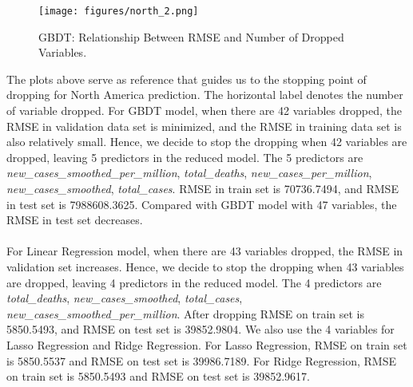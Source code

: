 \documentclass{article}
\begin{document}
\begin{figure}[H]
    \centering
    \texttt{[image: figures/north\_2.png]}%
    \caption{GBDT: Relationship Between RMSE and Number of Dropped Variables.}
    \label{fig:heatmap}
\end{figure}

The plots above serve as reference that guides us to the stopping point of dropping for North America prediction. The horizontal label denotes the number of variable dropped. For GBDT model, when there are 42 variables dropped, the RMSE in validation data set is minimized, and the RMSE in training data set is also relatively small. Hence, we decide to stop the dropping when 42 variables are dropped, leaving 5 predictors in the reduced model. The 5 predictors are \textit{new\_cases\_smoothed\_per\_million}, \textit{total\_deaths}, \textit{new\_cases\_per\_million}, \textit{new\_cases\_smoothed}, \textit{total\_cases}. RMSE in train set is 70736.7494, and RMSE in test set is 7988608.3625. Compared with GBDT model with 47 variables, the RMSE in test set decreases. \\
\\
For Linear Regression model, when there are 43 variables dropped, the RMSE in validation set increases. Hence, we decide to stop the dropping when 43 variables are dropped, leaving 4 predictors in the reduced model. The 4 predictors are \textit{total\_deaths}, \textit{new\_cases\_smoothed}, \textit{total\_cases}, \textit{new\_cases\_smoothed\_per\_million}. After dropping RMSE on train set is 5850.5493, and RMSE on test set is 39852.9804. We also use the 4 variables for Lasso Regression and Ridge Regression. For Lasso Regression, RMSE on train set is 5850.5537 and RMSE on test set is 39986.7189. For Ridge Regression, RMSE on train set is 5850.5493 and RMSE on test set is 39852.9617.
\end{document}
